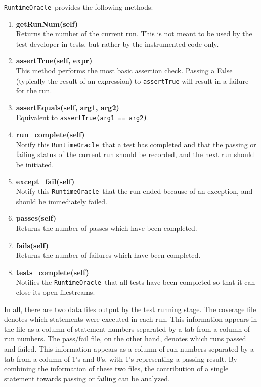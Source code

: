 \documentclass[english]{article}
\newcommand{\RO}{\texttt{RuntimeOracle}}
\begin{document}
\RO\ provides the following methods:
\begin{enumerate}
\item \textbf{getRunNum(self)} \\
    Returns the number of the current run. This is not meant to be used by the test developer in
    tests, but rather by the instrumented code only.
\item \textbf{assertTrue(self, expr)} \\
    This method performs the most basic assertion check. Passing a False (typically the result of an
    expression) to \texttt{assertTrue} will result in a failure for the run.
\item \textbf{assertEquals(self, arg1, arg2)} \\
    Equivalent to \texttt{assertTrue(arg1 == arg2)}. 
\item \textbf{run\_complete(self)} \\
    Notify this \RO\ that a test has completed and that the passing or failing status of
    the current run should be recorded, and the next run should be initiated.
\item \textbf{except\_fail(self)} \\
    Notify this \RO\ that the run ended because of an exception, and should be immediately
    failed.
\item \textbf{passes(self)}  \\
    Returns the number of passes which have been completed.
\item \textbf{fails(self)}  \\
    Returns the number of failures which have been completed.
\item \textbf{tests\_complete(self)} \\
    Notifies the \RO\ that all tests have been completed so that it can close its open
    filestreams.

\end{enumerate}

In all, there are two data files output by the test running stage. The coverage file denotes which
statements were executed in each run.
This information appears in the file as a column of statement numbers separated by a tab from a
column of run numbers.
The pass/fail file, on the other hand, denotes which runs passed and failed.
This information appears as a column of run numbers separated by a tab from a column of 1's and 0's,
with 1's representing a passing result.
By combining the information of these two files, the contribution of a single statement towards
passing or failing can be analyzed.
\end{document}
